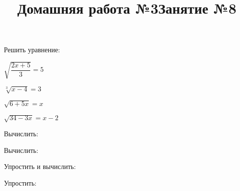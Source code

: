 \begin{listofex}
	\item Решить уравнение:
	\begin{enumcols}[itemcolumns=2]
		\item \( \sqrt{\dfrac{2x+5}{3}}=5 \) 
		\item \( \sqrt[3]{x-4}=3 \) 
		\item \( \sqrt{6+5x}=x \) 
		\item \( \sqrt{34-3x}=x-2 \) 
		\item {}
		\item {}
	\end{enumcols}
\end{listofex}

\newpage
\title{Домашняя работа №3}
\begin{listofex}
	\item Вычислить:
	\begin{enumcols}[itemcolumns=2]
		\item {}
		\item {}
		\item {}
		\item {}
	\end{enumcols}
	\item Вычислить:
	\begin{enumcols}[itemcolumns=2]
		\item {}
		\item {}
	\end{enumcols}
	\item Упростить и вычислить:
	\begin{enumcols}[itemcolumns=2]
		\item {}
		\item {}
		\item {}
	\end{enumcols}
	\item Упростить:
	\begin{enumcols}[itemcolumns=2]
		\item {}
		\item {}
	\end{enumcols}
	\item {}
	\item {}
\end{listofex}
\newpage
\title{Занятие №8}
